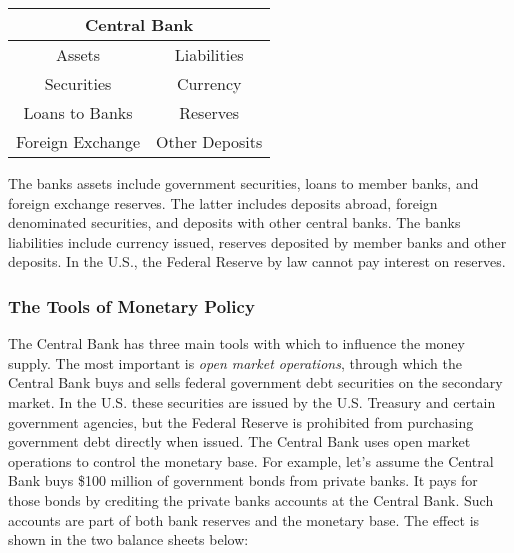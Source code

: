 \documentclass[letterpaper,12pt]{article}
\begin{document}
\bigskip

\begin{center}
\begin{tabular}{|cc|}
\hline \multicolumn{2}{|c|}{\textbf{Central Bank}} \\%
\hline\hline%
\multicolumn{1}{|c|}{Assets} & \multicolumn{1}{|c|}{Liabilities} \\%
\hline\hline%
Securities & \multicolumn{1}{|c|}{Currency} \\%
Loans to Banks & \multicolumn{1}{|c|}{Reserves} \\%
%
Foreign Exchange & \multicolumn{1}{|c|}{Other Deposits} \\%
%
\hline
\end{tabular}
\end{center}

The banks assets include government securities, loans to member
banks, and foreign exchange reserves. The latter includes deposits
abroad, foreign denominated securities, and deposits with other
central banks. The banks liabilities include currency issued,
reserves deposited by member banks and other deposits. In the U.S.,
the Federal Reserve by law cannot pay interest on reserves.

\subsubsection*{The Tools of Monetary Policy}

The Central Bank has three main tools with which to influence the
money supply. The most important is \textit{open market operations},
through which the Central Bank buys and sells federal government
debt securities on the secondary market. In the U.S. these
securities are issued by the U.S. Treasury and certain government
agencies, but the Federal Reserve is prohibited from purchasing
government debt directly when issued. The Central Bank uses open
market operations to control the monetary base. For example, let's
assume the Central Bank buys \$100 million of government bonds from
private banks. It pays for those bonds by crediting the private
banks accounts at the Central Bank. Such accounts are part of both
bank reserves and the monetary base. The effect is shown in the two
balance sheets below:
\end{document}
